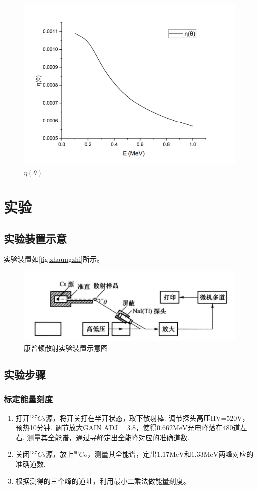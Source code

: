 \documentclass[font=default]{mpltx}
\begin{document}
\begin{figure}[htbp]
  \centering
  \includegraphics[width=0.6\linewidth]{fig/yita.png}
  \caption{$\eta(\theta)$}
  \label{fig:eta}
\end{figure}

\section{实验}
\subsection{实验装置示意}
实验装置如\autoref{fig:zhaungzhi}所示。

\begin{figure}[htbp]
  \centering
  \includegraphics[width=0.6\linewidth]{fig/zhuangzhi.png}
  \caption{康普顿散射实验装置示意图}
  \label{fig:zhaungzhi}
\end{figure}


\subsection{实验步骤}
  \subsubsection{标定能量刻度}
    \begin{enumerate}
      \item 打开${^{137}Cs}$源，将开关打在半开状态，取下散射棒. 调节探头高压$\text{HV=520V}$，预热10分钟. 调节放大$\text{GAIN ADJ} = 3.8$，使得$0.662\text{MeV}$光电峰落在480道左右. 测量其全能谱，通过寻峰定出全能峰对应的准确道数.
      \item 关闭${^{137}Cs}$源，放上${^{60}Co}$，测量其全能谱，定出$1.17\text{MeV}$和$1.33\text{MeV}$两峰对应的准确道数.
      \item 根据测得的三个峰的道址，利用最小二乘法做能量刻度。
    \end{enumerate}
\end{document}
